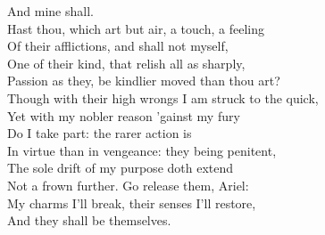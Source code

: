 

\begin{verse_speech}[Prospero] 
And mine shall.\\
Hast thou, which art but air, a touch, a feeling\\
Of their afflictions, and shall not myself,\\
One of their kind, that relish all as sharply,\\
Passion as they, be kindlier moved than thou art?\\
Though with their high wrongs I am struck to the quick,\\
Yet with my nobler reason 'gainst my fury\\
Do I take part: the rarer action is\\
In virtue than in vengeance: they being penitent,\\
The sole drift of my purpose doth extend\\
Not a frown further. Go release them, Ariel:\\
My charms I'll break, their senses I'll restore,\\
And they shall be themselves.
\end{verse_speech}

	


